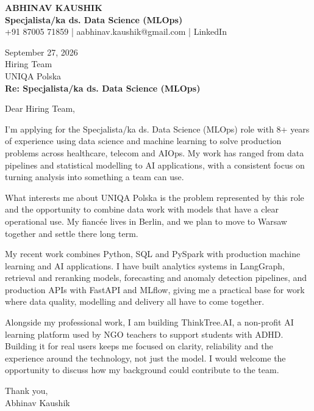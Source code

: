 \documentclass[10pt,a4paper]{article}
\begin{document}
\begin{center}
{\Large\bfseries ABHINAV KAUSHIK}\\[2pt]
{\bfseries Specjalista/ka ds. Data Science (MLOps)}\\[2pt]
+91 87005 71859 \quad | \quad aabhinav.kaushik@gmail.com \quad | \quad LinkedIn
\end{center}
\vspace{8pt}
September 27, 2026\\[6pt]
Hiring Team\\
UNIQA Polska\\[4pt]
\textbf{Re: Specjalista/ka ds. Data Science (MLOps)}

Dear Hiring Team,

I’m applying for the Specjalista/ka ds. Data Science (MLOps) role with 8+ years of experience using data science and machine learning to solve production problems across healthcare, telecom and AIOps. My work has ranged from data pipelines and statistical modelling to AI applications, with a consistent focus on turning analysis into something a team can use.

What interests me about UNIQA Polska is the problem represented by this role and the opportunity to combine data work with models that have a clear operational use. My fiancée lives in Berlin, and we plan to move to Warsaw together and settle there long term.

My recent work combines Python, SQL and PySpark with production machine learning and AI applications. I have built analytics systems in LangGraph, retrieval and reranking models, forecasting and anomaly detection pipelines, and production APIs with FastAPI and MLflow, giving me a practical base for work where data quality, modelling and delivery all have to come together.

Alongside my professional work, I am building ThinkTree.AI, a non-profit AI learning platform used by NGO teachers to support students with ADHD. Building it for real users keeps me focused on clarity, reliability and the experience around the technology, not just the model. I would welcome the opportunity to discuss how my background could contribute to the team.

Thank you,\\
Abhinav Kaushik
\end{document}
